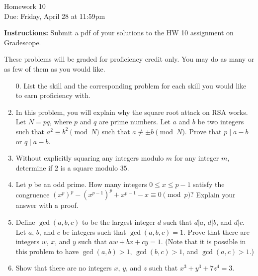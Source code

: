 \documentclass[12pt]{article}
\begin{document}
\begin{center}
{\Large Homework 10}\\
Due: Friday,  April 28 at 11:59pm\\


\end{center}
{\bf Instructions:} Submit a pdf of your solutions to the HW 10 assignment on Gradescope.  

{ These problems will be graded for proficiency credit only.  You may do as many or as few of them as you would like.}



\begin{enumerate}
\item[0.] List the skill and the corresponding problem for each skill you would like to earn proficiency with. 

\item  In this problem, you will explain why the square root attack on RSA works. Let $N=pq$, where $p$ and $q$ are prime numbers.  Let $a$ and $b$ be two integers such that $a^2\equiv b^2\pmod N$ such that $a\not \equiv \pm b\pmod{N}$.  Prove that $p\mid a-b$ or $q\mid a-b$. 

\item Without explicitly squaring any integers modulo $m$ for any integer $m$, determine if $2$ is a square modulo $35$. 

\item Let $p$ be an odd prime. How many integers $0\le x \le p-1$ satisfy the congruence $(x^p)^p-(x^{p-1})^p+x^{p-1}-x\equiv 0\pmod{p}?$ Explain your answer with a proof. 

\item Define $\gcd(a,b,c)$ to be the largest integer $d$ such that $d|a$, $d|b$, and $d|c$.  Let $a$, $b$, and $c$ be integers such that $\gcd(a,b,c)=1$. Prove that there are integers $w$, $x$, and $y$ such that $aw+bx+cy=1$.  (Note that it is possible in this problem to have $\gcd(a,b)>1$, $\gcd(b,c)>1$, and $\gcd(a,c)>1$.)

\item Show that there are no integers $x$, $y$, and $z$ such that $x^3+y^3+7z^4=3$. 

\end{enumerate}
\end{document}
